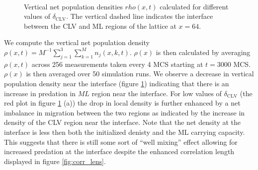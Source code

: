 \documentclass[12pt]{article}
\begin{document}
\begin{figure}[h]
    \begin{center}
    \\
    \caption{Vertical net population densities $ rho(x,t) $  calculated for different values of $ \delta_{\mathrm{CLV}} $.
    The vertical dashed line indicates the interface between the CLV and ML regions of the lattice at $ x = 64 $.}
    \label{fig:den}
    \end{center} 
\end{figure}

We compute the vertical net population density $ \rho(x,t) = M^{-1} \sum_{j=1}^3\sum_{k=1}^{M}n_j(x,k,t)$. $ \rho(x) $ is 
then calculated by averaging $ \rho(x,t) $ across 256 measurements taken every 4 MCS
starting at $ t=3000 $  MCS. $ \rho(x) $ is then averaged over 50 simulation runs. 
We observe a decrease in vertical population density near the interface (figure \ref{fig:den})
indicating that there is an increase in predation in $ ML $ region near the interface.
For low values of $ \delta_{\mathrm{CLV}} $ (the red plot in figure \ref{fig:den} (a))
the drop in local density is further enhanced by a net imbalance in migration between 
the two regions as indicated by the increase in density of the CLV region near
the interface. Note that the net density at the interface is less then both
the initialized denisty and the ML carrying capacity. This suggests that there 
is still some sort of ``well mixing'' effect allowing for increased predation at 
the interface despite the enhanced correlation length displayed in figure \ref{fig:corr_lens}.
\end{document}
